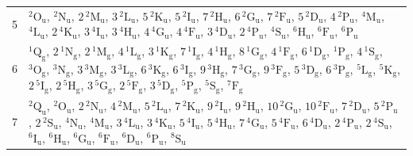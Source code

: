 \documentclass[10pt,a4paper]{article}
\numberwithin{equation}{section}
\newcommand{\spec}[1]{\mathrm{#1}}
\newcommand{\ptag}[1]{\mathrm{#1}}
\newcommand{\term}[2]{{}^{#1}#2}
\newlength{\fillwidth}\newlength{\cellwidth}\newlength{\colwidth}
\begin{document}
{\begin{longtable}{@{}r>{\RaggedRight\arraybackslash}p{\fillwidth}@{}}
5 & $\term{2}{\spec{O}_{\ptag{u}}}$, $\term{2}{\spec{N}_{\ptag{u}}}$, $2\,\term{2}{\spec{M}_{\ptag{u}}}$, $3\,\term{2}{\spec{L}_{\ptag{u}}}$, $5\,\term{2}{\spec{K}_{\ptag{u}}}$, $5\,\term{2}{\spec{I}_{\ptag{u}}}$, $7\,\term{2}{\spec{H}_{\ptag{u}}}$, $6\,\term{2}{\spec{G}_{\ptag{u}}}$, $7\,\term{2}{\spec{F}_{\ptag{u}}}$, $5\,\term{2}{\spec{D}_{\ptag{u}}}$, $4\,\term{2}{\spec{P}_{\ptag{u}}}$, $\term{4}{\spec{M}_{\ptag{u}}}$, $\term{4}{\spec{L}_{\ptag{u}}}$, $2\,\term{4}{\spec{K}_{\ptag{u}}}$, $3\,\term{4}{\spec{I}_{\ptag{u}}}$, $3\,\term{4}{\spec{H}_{\ptag{u}}}$, $4\,\term{4}{\spec{G}_{\ptag{u}}}$, $4\,\term{4}{\spec{F}_{\ptag{u}}}$, $3\,\term{4}{\spec{D}_{\ptag{u}}}$, $2\,\term{4}{\spec{P}_{\ptag{u}}}$, $\term{4}{\spec{S}_{\ptag{u}}}$, $\term{6}{\spec{H}_{\ptag{u}}}$, $\term{6}{\spec{F}_{\ptag{u}}}$, $\term{6}{\spec{P}_{\ptag{u}}}$\\
6 & $\term{1}{\spec{Q}_{\ptag{g}}}$, $2\,\term{1}{\spec{N}_{\ptag{g}}}$, $2\,\term{1}{\spec{M}_{\ptag{g}}}$, $4\,\term{1}{\spec{L}_{\ptag{g}}}$, $3\,\term{1}{\spec{K}_{\ptag{g}}}$, $7\,\term{1}{\spec{I}_{\ptag{g}}}$, $4\,\term{1}{\spec{H}_{\ptag{g}}}$, $8\,\term{1}{\spec{G}_{\ptag{g}}}$, $4\,\term{1}{\spec{F}_{\ptag{g}}}$, $6\,\term{1}{\spec{D}_{\ptag{g}}}$, $\term{1}{\spec{P}_{\ptag{g}}}$, $4\,\term{1}{\spec{S}_{\ptag{g}}}$, $\term{3}{\spec{O}_{\ptag{g}}}$, $\term{3}{\spec{N}_{\ptag{g}}}$, $3\,\term{3}{\spec{M}_{\ptag{g}}}$, $3\,\term{3}{\spec{L}_{\ptag{g}}}$, $6\,\term{3}{\spec{K}_{\ptag{g}}}$, $6\,\term{3}{\spec{I}_{\ptag{g}}}$, $9\,\term{3}{\spec{H}_{\ptag{g}}}$, $7\,\term{3}{\spec{G}_{\ptag{g}}}$, $9\,\term{3}{\spec{F}_{\ptag{g}}}$, $5\,\term{3}{\spec{D}_{\ptag{g}}}$, $6\,\term{3}{\spec{P}_{\ptag{g}}}$, $\term{5}{\spec{L}_{\ptag{g}}}$, $\term{5}{\spec{K}_{\ptag{g}}}$, $2\,\term{5}{\spec{I}_{\ptag{g}}}$, $2\,\term{5}{\spec{H}_{\ptag{g}}}$, $3\,\term{5}{\spec{G}_{\ptag{g}}}$, $2\,\term{5}{\spec{F}_{\ptag{g}}}$, $3\,\term{5}{\spec{D}_{\ptag{g}}}$, $\term{5}{\spec{P}_{\ptag{g}}}$, $\term{5}{\spec{S}_{\ptag{g}}}$, $\term{7}{\spec{F}_{\ptag{g}}}$\\
7 & $\term{2}{\spec{Q}_{\ptag{u}}}$, $\term{2}{\spec{O}_{\ptag{u}}}$, $2\,\term{2}{\spec{N}_{\ptag{u}}}$, $4\,\term{2}{\spec{M}_{\ptag{u}}}$, $5\,\term{2}{\spec{L}_{\ptag{u}}}$, $7\,\term{2}{\spec{K}_{\ptag{u}}}$, $9\,\term{2}{\spec{I}_{\ptag{u}}}$, $9\,\term{2}{\spec{H}_{\ptag{u}}}$, $10\,\term{2}{\spec{G}_{\ptag{u}}}$, $10\,\term{2}{\spec{F}_{\ptag{u}}}$, $7\,\term{2}{\spec{D}_{\ptag{u}}}$, $5\,\term{2}{\spec{P}_{\ptag{u}}}$, $2\,\term{2}{\spec{S}_{\ptag{u}}}$, $\term{4}{\spec{N}_{\ptag{u}}}$, $\term{4}{\spec{M}_{\ptag{u}}}$, $3\,\term{4}{\spec{L}_{\ptag{u}}}$, $3\,\term{4}{\spec{K}_{\ptag{u}}}$, $5\,\term{4}{\spec{I}_{\ptag{u}}}$, $5\,\term{4}{\spec{H}_{\ptag{u}}}$, $7\,\term{4}{\spec{G}_{\ptag{u}}}$, $5\,\term{4}{\spec{F}_{\ptag{u}}}$, $6\,\term{4}{\spec{D}_{\ptag{u}}}$, $2\,\term{4}{\spec{P}_{\ptag{u}}}$, $2\,\term{4}{\spec{S}_{\ptag{u}}}$, $\term{6}{\spec{I}_{\ptag{u}}}$, $\term{6}{\spec{H}_{\ptag{u}}}$, $\term{6}{\spec{G}_{\ptag{u}}}$, $\term{6}{\spec{F}_{\ptag{u}}}$, $\term{6}{\spec{D}_{\ptag{u}}}$, $\term{6}{\spec{P}_{\ptag{u}}}$, $\term{8}{\spec{S}_{\ptag{u}}}$\\

\end{longtable}}
\end{document}
